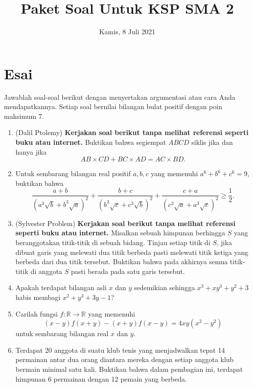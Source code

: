 \documentclass[12pt]{scrartcl}
\title{Paket Soal Untuk KSP SMA 2}
\date{Kamis, 8 Juli 2021}
\begin{document}
	\maketitle

\renewcommand*\contentsname{Daftar Isi}
\tableofcontents

\newpage

\section{Esai}
Jawablah soal-soal berikut dengan menyertakan argumentasi atau cara Anda mendapatkannya. Setiap soal bernilai bilangan bulat positif dengan poin maksimum 7.

\begin{enumerate}[resume]
	\item (Dalil Ptolemy) \textbf{Kerjakan soal berikut tanpa melihat referensi seperti buku atau internet.} Buktikan bahwa segiempat $ABCD$ siklis jika dan hanya jika $$AB \times CD + BC \times AD = AC \times BD.$$
	
	\item Untuk sembarang bilangan real positif $a,b,c$ yang memenuhi $a^6+b^6+c^6=9$, buktikan bahwa $$\dfrac{a+b}{(a^3\sqrt{b}+b^3\sqrt{a})^2}+\dfrac{b+c}{(b^3\sqrt{c}+c^3\sqrt{b})^2}+\dfrac{c+a}{(c^3\sqrt{a}+a^3\sqrt{c})^2} \ge \dfrac{1}{2}.$$
	
	\item (Sylvester Problem) \textbf{Kerjakan soal berikut tanpa melihat referensi seperti buku atau internet. } Misalkan sebuah himpunan berhingga $S$ yang beranggotakan titik-titik di sebuah bidang. Tinjau setiap titik di $S$, jika dibuat garis yang melewati dua titik berbeda pasti melewati titik ketiga yang berbeda dari dua titik tersebut. Buktikan bahwa pada akhirnya semua titik-titik di anggota $S$ pasti berada pada satu garis tersebut.
	
	\item Apakah terdapat bilangan asli $x$ dan $y$ sedemikian sehingga $x^3+xy^3+y^2+3$ habis membagi $x^2+y^3+3y-1$?
	
	\item Carilah fungsi $f:\mathbb{R} \rightarrow \mathbb{R}$ yang memenuhi $$(x-y)f(x+y)-(x+y)f(x-y) = 4xy(x^2-y^2)$$ untuk sembarang bilangan real $x$ dan $y$.
	
	\item Terdapat 20 anggota di suatu klub tenis yang menjadwalkan tepat 14 permainan antar dua orang diantara mereka dengan setiap anggota klub bermain minimal satu kali. Buktikan bahwa dalam pembagian ini, terdapat himpunan 6 permainan dengan 12 pemain yang berbeda.
	

\end{enumerate}
\end{document}
